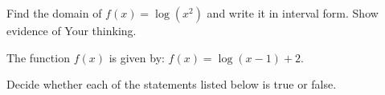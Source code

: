 \documentclass[11pt,answers]{exam}
\begin{document}
\begin{questions}


\addpoints



\question[2] Find the domain of $\displaystyle f(x)=\log \left (x^2\right)$ and write it in interval form. Show evidence of Your thinking.


\fillwithdottedlines{3cm}

\medskip

\question The function $f(x)$ is given by: $\displaystyle f(x) = \log (x-1)+2$. 


\medskip

\question Decide whether each of the statements listed below is true or false.


\end{questions}
\end{document}
